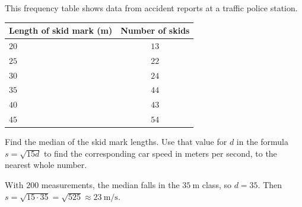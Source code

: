 \question[10]
This frequency table shows data from accident reports at a traffic police station.
\begin{center}
  \small
  \begin{tabular}{|l|c|}
    \hline
    Length of skid mark (m) & Number of skids \\
    \hline
    $20$ & $13$ \\
    \hline
    $25$ & $22$ \\
    \hline
    $30$ & $24$ \\
    \hline
    $35$ & $44$ \\
    \hline
    $40$ & $43$ \\
    \hline
    $45$ & $54$ \\
    \hline
  \end{tabular}
\end{center}
Find the median of the skid mark lengths. Use that value for $d$ in the formula $s=\sqrt{15d}$ to find the corresponding car speed in meters per second, to the nearest whole number.
\begin{solution}
  With $200$ measurements, the median falls in the $35\ \mathrm{m}$ class, so $d=35$. Then $s=\sqrt{15\cdot 35}=\sqrt{525}\approx 23\ \mathrm{m/s}$.
\end{solution}


